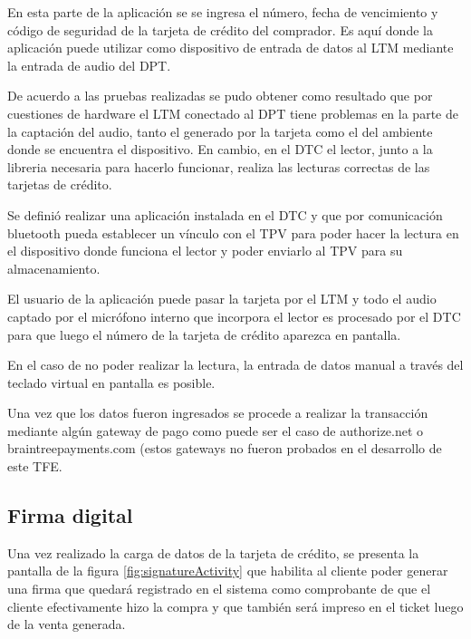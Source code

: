 En esta parte de la aplicaci\'on se se ingresa el n\'umero, fecha de vencimiento y c\'odigo de seguridad de la tarjeta de cr\'edito del comprador. Es aqu\'i donde la aplicaci\'on puede utilizar como dispositivo de entrada de datos al \ac{LTM} mediante la entrada de audio del \ac{DPT}.

De acuerdo a las pruebas realizadas se pudo obtener como resultado que por cuestiones de hardware el \ac{LTM} conectado al \ac{DPT} tiene problemas en la parte de la captaci\'on del audio, tanto el generado por la tarjeta como el del ambiente donde se encuentra el dispositivo. En cambio, en el \ac{DTC} el lector, junto a la libreria necesaria para hacerlo funcionar, realiza las lecturas correctas de las tarjetas de cr\'edito.

Se defini\'o realizar una aplicaci\'on instalada en el \ac{DTC} y que por comunicaci\'on bluetooth pueda establecer un v\'inculo con el \ac{TPV} para poder hacer la lectura en el dispositivo donde funciona el lector y poder enviarlo al \ac{TPV} para su almacenamiento.

El usuario de la aplicaci\'on puede pasar la tarjeta por el \ac{LTM} y todo el audio captado por el micr\'ofono interno que incorpora el lector es procesado por el \ac{DTC} para que luego el n\'umero de la tarjeta de cr\'edito aparezca en pantalla.

En el caso de no poder realizar la lectura, la entrada de datos manual a trav\'es del teclado virtual en pantalla es posible.

Una vez que los datos fueron ingresados se procede a realizar la transacci\'on mediante alg\'un gateway de pago como puede ser el caso de authorize.net o braintreepayments.com (estos gateways no fueron probados en el desarrollo de este \ac{TFE}.


\subsection{Firma digital}
\label{subsec:ui.addsale.signature}

Una vez realizado la carga de datos de la tarjeta de cr\'edito, se presenta la pantalla de la figura \ref{fig:signatureActivity} que habilita al cliente poder generar una firma que quedar\'a registrado en el sistema como comprobante de que el cliente efectivamente hizo la compra y que tambi\'en ser\'a impreso en el ticket luego de la venta generada.

